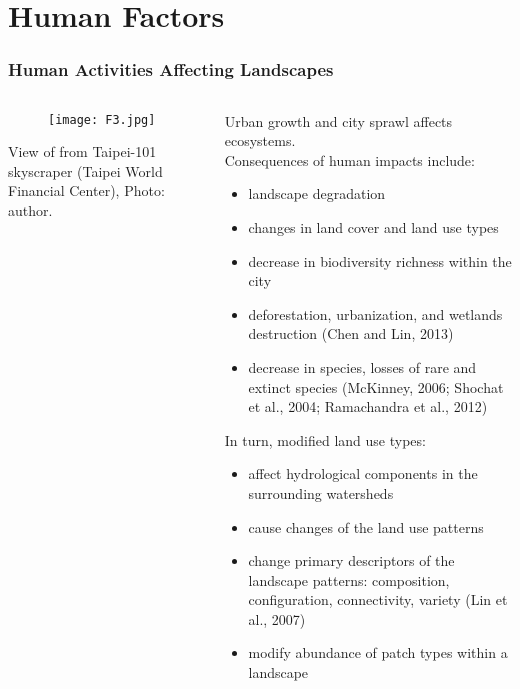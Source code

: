 \documentclass[pdflatex,compress,8pt,
	xcolor={dvipsnames,dvipsnames,svgnames,x11names,table},
	hyperref={colorlinks = true,breaklinks = true, urlcolor = NavyBlue, breaklinks = true}]{beamer}
\begin{document}
\section{Human Factors}
\begin{frame}\frametitle{Human Activities Affecting Landscapes}
\begin{minipage}[0.4\textheight]{\textwidth}
\begin{columns}[T]
\begin{column}{0.4\textwidth}
\begin{figure}[H]
	\centering
		\texttt{[image: F3.jpg]}
\end{figure}
\small{View of from Taipei-101 skyscraper (Taipei World Financial Center), Photo: author.}
\end{column}
\begin{column}{0.6\textwidth}
\vspace{1em}
Urban growth and city sprawl affects ecosystems. \\
Consequences of human impacts include:
\small{
\begin{itemize}
	\item landscape degradation
	\item changes in land cover and land use types
	\item decrease in biodiversity richness within the city
	\item deforestation, urbanization, and wetlands destruction (Chen and Lin, 2013)
	\item decrease in species, losses of rare and extinct species (McKinney, 2006; Shochat et al., 2004; Ramachandra et al., 2012)
\end{itemize}
In turn, modified land use types:
\begin{itemize}
	\item affect hydrological components in the surrounding watersheds
	\item cause changes of the land use \alert{patterns}
	\item change primary descriptors of the landscape patterns: \alert{composition, configuration, connectivity, variety} (Lin et al., 2007)
	\item modify \alert{abundance} of patch types within a landscape
\end{itemize}}
\end{column}
\end{columns}
\end{minipage}
\end{frame}
\end{document}

